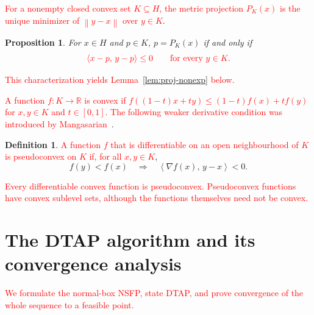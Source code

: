 \documentclass[]{interact}
\theoremstyle{plain}
\newtheorem{proposition}[theorem]{Proposition}
\theoremstyle{definition}
\newtheorem{definition}[theorem]{Definition}
\theoremstyle{remark}
\newcommand{\R}{\mathbb{R}}
\newcommand{\norm}[1]{\left\lVert #1 \right\rVert}
\newcommand{\inner}[2]{\left\langle #1,\, #2 \right\rangle}
\begin{document}
\leavevmode\textcolor{red}{For a nonempty closed convex set $K\subseteq H$, the metric projection $P_K(x)$ is the unique minimizer of $\norm{y-x}$ over $y\in K$}.
\begin{proposition}\label{prop:proj-char}
For $x\in H$ and $p\in K$, $p=P_K(x)$ if and only if
\begin{equation}\label{eq:proj-char}\textcolor{red}{
\inner{x-p}{y-p}\le0\qquad\text{for every }y\in K.
}\end{equation}
\end{proposition}
\leavevmode\textcolor{red}{This characterization yields Lemma~\ref{lem:proj-nonexp} below.}

\leavevmode\textcolor{red}{A function $f:K\to\R$ is convex if
$f((1-t)x+ty)\le(1-t)f(x)+tf(y)$ for $x,y\in K$ and $t\in[0,1]$.
The following weaker derivative condition was introduced by Mangasarian~\citep{mangasarian1965}}.
\begin{definition}\label{def:pseudoconvex}
\leavevmode\textcolor{red}{A function $f$ that is differentiable on an open neighbourhood of $K$ is pseudoconvex on $K$ if, for all $x,y\in K$},
\begin{equation}\label{eq:contrapositive}
f(y)<f(x)\quad\Longrightarrow\quad\inner{\nabla f(x)}{y-x}<0.
\end{equation}
\end{definition}
\leavevmode\textcolor{red}{Every differentiable convex function is pseudoconvex. Pseudoconvex functions have convex sublevel sets, although the functions themselves need not be convex.}

\section{The DTAP algorithm and its convergence analysis}\label{sec:convergence}
\leavevmode\textcolor{red}{We formulate the normal-box NSFP, state DTAP, and prove convergence of the whole sequence
to a feasible point.}
\end{document}
